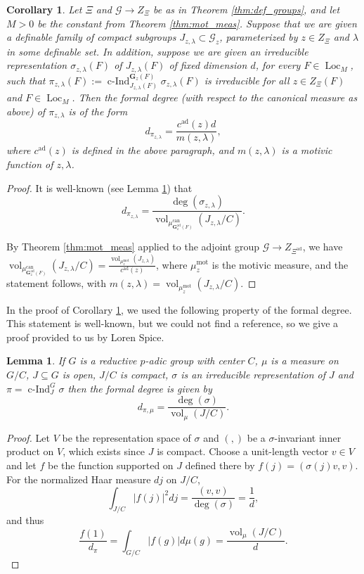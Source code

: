 \documentclass{amsart}
\newcommand{\cF}{\mathcal{F}}
\newcommand{\cG}{\mathcal{G}}
\DeclareMathOperator{\vol}{vol}
\DeclareMathOperator{\loc}{Loc}
\DeclareMathOperator{\ind}{c-Ind}
\newcommand{\bG}{\mathbf{G}}
\newcommand{\can}{\mathrm{can}}
\newcommand\mot{\mathrm{mot}}
\newcommand\ad{\mathrm{ad}}
\theoremstyle{plain}
\newtheorem{lem}[thm]{Lemma}
\newtheorem{cor}[thm]{Corollary}
\theoremstyle{definition}
\begin{document}
\begin{cor} \label{cor:form_deg} Let $\Xi$ 
and $\cG \to Z_\Xi$ be as in Theorem \ref{thm:def_groups}, and let $M>0$ be the constant from Theorem \ref{thm:mot_meas}.
Suppose that we are given a definable family of compact subgroups $J_{z, \lambda} \subset \cG_z$,
parameterized by $z \in Z_\Xi$ and $\lambda$ in some definable set.
In addition, suppose we are given an irreducible representation  
$\sigma_{z, \lambda}(F)$ of $J_{z, \lambda}(F)$ of fixed dimension $d$, for every $F\in \loc_M$, such 
that $\pi_{z,\lambda}(F) := \ind_{J_{z,\lambda}(F)}^{\bG_z(F)} \sigma_{z,\lambda}(F)$
is irreducible for all $z \in Z_\Xi(F)$ and $F \in \loc_M$.
Then the formal degree (with respect to the canonical measure as above) of $\pi_{z, \lambda}$ is of the form 
\[
d_{\pi_{z, \lambda}}=\frac{c^\ad(z)d}{m(z, \lambda)},
\]
where $c^\ad(z)$ is defined in the above paragraph, and 
$m(z, \lambda)$ is a motivic function of $z, \lambda$. 
\end{cor}
\begin{proof}
It is well-known (see Lemma \ref{lem:well-known}) that
\begin{equation}\label{eq:well-known}
d_{\pi_{z, \lambda}}=\frac{\deg(\sigma_{z, \lambda})}{\vol_{\mu_{\bG_z^\ad(F)}^\can}(J_{z, \lambda}/C)}.
\end{equation}

By Theorem \ref{thm:mot_meas} applied to the adjoint group $\cG\to Z_{\Xi^\ad}$, we have $\vol_{\mu_{\bG_z^\ad(F)}^\can}(J_{z, \lambda}/C) = \frac{\vol_{\mu^\mot_z}(J_{z, \lambda})}{c^\ad(z)}$, where $\mu^\mot_z$ is the motivic measure, 
and the statement follows, with $m(z, \lambda)=\vol_{\mu^\mot_z}(J_{z, \lambda}/C)$.
\end{proof}

In the proof of Corollary \ref{cor:form_deg}, we used the following property of the formal degree.
This statement is well-known, but we could not find a reference, so we give a proof provided to us by Loren Spice.

\begin{lem} \label{lem:well-known}
If $G$ is a reductive $p$-adic group with center $C$, $\mu$ is a measure on $G/C$, $J \subseteq G$ is open, $J/C$ is compact,
$\sigma$ is an irreducible representation of $J$ and $\pi = \ind_J^G \sigma$ then the formal degree is given by
\[
d_{\pi,\mu} = \frac{\deg(\sigma)}{\vol_\mu(J/C)}.
\]
\end{lem}
\begin{proof}
Let $V$ be the representation space of $\sigma$ and $(,)$ be a $\sigma$-invariant
inner product on $V$, which exists since $J$ is compact.
Choose a unit-length vector $v \in V$ and let $f$ be the function supported on $J$
defined there by $f(j) = (\sigma(j)v,v)$.  For the normalized Haar measure $dj$ on $J/C$,
\[
\int_{J/C} \lvert f(j)\rvert^2 dj = \frac{(v,v)}{\deg(\sigma)} = \frac{1}{d},
\]
and thus
\[
\frac{f(1)}{d_\pi} = \int_{G/C} \lvert f(g) \rvert d\mu(g) = \frac{\vol_\mu(J/C)}{d}.
\]
\end{proof}
\end{document}

